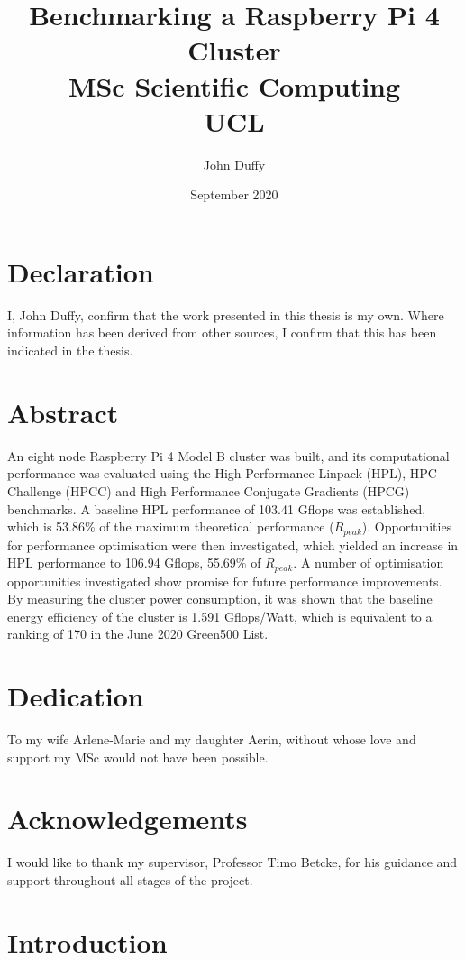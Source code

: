 \documentclass{report}
\title{Benchmarking a Raspberry Pi 4 Cluster\\MSc Scientific Computing\\UCL}
\author{John Duffy}
\date{September 2020}
\begin{document}
%
%
\maketitle
%


%
% 
\chapter*{Declaration}
I, John Duffy, confirm that the work presented in this thesis is my own. Where information has been derived from other sources, I confirm that this has been indicated in the thesis.

%
%
\chapter*{Abstract}
%
An eight node Raspberry Pi 4 Model B cluster was built, and its computational performance was evaluated using the High Performance Linpack (HPL), HPC Challenge (HPCC) and High Performance Conjugate Gradients (HPCG) benchmarks. A baseline HPL performance of 103.41 Gflops was established, which is 53.86\% of the maximum theoretical performance ($R_{peak}$). Opportunities for performance optimisation were then investigated, which yielded an increase in HPL performance to 106.94 Gflops, 55.69\% of $R_{peak}$. A number of optimisation opportunities investigated show promise for future performance improvements. By measuring the cluster power consumption, it was shown that the baseline energy efficiency of the cluster is 1.591 Gflops/Watt, which is equivalent to a ranking of 170 in the June 2020 Green500 List.


%
%
\chapter*{Dedication}
To my wife Arlene-Marie and my daughter Aerin, without whose love and support my MSc would not have been possible. 


%
%
\chapter*{Acknowledgements}
I would like to thank my supervisor, Professor Timo Betcke, for his guidance and support throughout all stages of the project. 


%
%
\tableofcontents


%
%
\chapter{Introduction}

\end{document}
